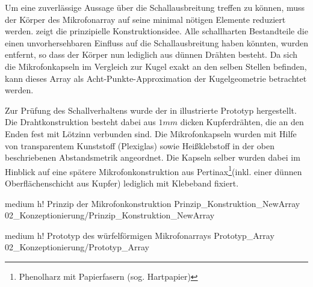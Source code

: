 Um eine zuverlässige Aussage über die Schallausbreitung treffen zu können, muss der Körper des Mikrofonarray auf seine minimal nötigen Elemente reduziert werden.  zeigt die prinzipielle Konstruktionsidee. Alle schallharten Bestandteile die einen unvorhersehbaren Einfluss auf die Schallausbreitung haben könnten, wurden entfernt, so dass der Körper nun lediglich aus dünnen Drähten besteht. Da sich die Mikrofonkapseln im Vergleich zur Kugel exakt an den selben Stellen befinden, kann dieses Array als Acht-Punkte-Approximation der Kugelgeometrie betrachtet werden.

Zur Prüfung des Schallverhaltens wurde der in  illustrierte Prototyp hergestellt. Die Drahtkonstruktion besteht dabei aus $1mm$ dicken Kupferdrähten, die an den Enden fest mit Lötzinn verbunden sind. Die Mikrofonkapseln wurden mit Hilfe von transparentem Kunststoff (Plexiglas) sowie Heißklebstoff in der oben beschriebenen Abstandsmetrik angeordnet. Die Kapseln selber wurden dabei im Hinblick auf eine spätere Mikrofonkonstruktion aus Pertinax\footnote{Phenolharz mit Papierfasern (sog. Hartpapier)}(inkl. einer dünnen Oberflächenschicht aus Kupfer) lediglich mit Klebeband fixiert.


         {medium}                 %
         {h!}             %
         {Prinzip der Mikrofonkonstruktion}                %
         {Prinzip_Konstruktion_NewArray}                %
         {02_Konzeptionierung/Prinzip_Konstruktion_NewArray}     %



         {medium}                 %
         {h!}             %
         {Prototyp des würfelförmigen Mikrofonarrays}                %
         {Prototyp_Array}                %
         {02_Konzeptionierung/Prototyp_Array}     %



